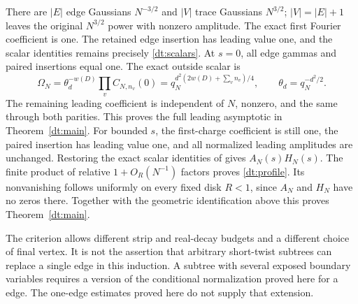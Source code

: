 There are \(|E|\) edge Gaussians \(N^{-3/2}\) and \(|V|\) trace Gaussians \(N^{3/2}\);
\(|V|=|E|+1\) leaves the original \(N^{3/2}\) power with nonzero amplitude.
The exact first Fourier coefficient is one. The retained edge insertion
has leading value one, and the scalar identities remains precisely \eqref{dt:scalars}.
At \(s=0\), all edge gammas and paired insertions equal one.
The exact outside scalar is
\[
 \Omega_N=\theta_d^{-w(D)}\prod_vC_{N,n_v}(0)
       =q_N^{d^2(2w(D)+\sum_v n_v)/4},
 \qquad \theta_d=q_N^{-d^2/2}.
\]
The remaining leading coefficient is independent of \(N\), nonzero,
and the same through both parities. This proves the full leading
asymptotic in Theorem~\ref{dt:main}.
For bounded \(s\), the first-charge coefficient is still one, the
paired insertion has leading value one, and all normalized leading
amplitudes are unchanged. Restoring the exact scalar identities of
\cite[Proposition~8.1]{Meridian} gives \(A_N(s)H_N(s)\).
The finite product of relative \(1+O_R(N^{-1})\) factors proves
\eqref{dt:profile}. Its nonvanishing follows uniformly on every
fixed disk \(R<1\), since \(A_N\) and \(H_N\) have no zeros there.
Together with the geometric identification above this proves
Theorem~\ref{dt:main}.

The criterion allows different strip and real-decay budgets and a
different choice of final vertex. It is not the assertion that arbitrary
short-twist subtrees can replace a single edge in this induction.
A subtree with several exposed boundary variables requires a version of the conditional
normalization proved here for a edge. The one-edge estimates proved here do not supply that extension.
